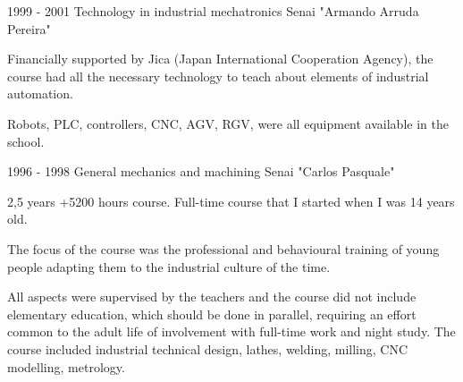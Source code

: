 \newpage
{}

\cvmetaevent
{1999 - 2001}
{Technology in industrial mechatronics}
{Senai "Armando Arruda Pereira"}
{Financially supported by Jica (Japan International Cooperation Agency), the course had all the necessary technology to teach about elements of industrial automation.

	Robots, PLC, controllers, CNC, AGV, RGV, were all equipment available in the school.}

\cvmetaevent
{1996 - 1998}
{General mechanics and machining}
{Senai "Carlos Pasquale"}
{2,5 years +5200 hours course. Full-time course that I started when I was 14 years old.

	The focus of the course was the professional and behavioural training of young people adapting them to the industrial culture of the time.

	All aspects were supervised by the teachers and the course did not include elementary education, which should be done in parallel, requiring an effort common to the adult life of involvement with full-time work and night study.
	The course included industrial technical design, lathes, welding, milling, CNC modelling, metrology.}

\vfill\null

